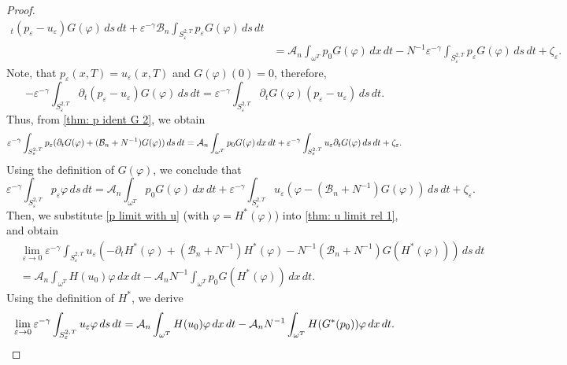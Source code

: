 \documentclass[reqno]{amsart}
\begin{document}
\begin{proof}
\begin{equation}
\begin{aligned}
_{t}(p_{\varepsilon }-u_{\varepsilon })G(\varphi )\,ds\,dt+\varepsilon
^{-\gamma }\mathcal{B}_n\int _{S_{\varepsilon }^{2,T}}p_{\varepsilon
}G(\varphi )\,ds\,dt    \\
&=\mathcal{A}_n\int _{\omega ^{T}}p_0G(\varphi )\,dx\,dt%
-N^{-1}\varepsilon ^{-\gamma }\int _{S_{\varepsilon
}^{2,T}}p_{\varepsilon }G(\varphi )\,ds\,dt+\zeta _{\varepsilon }.
\end{aligned} \label{thm: p ident G 2}
\end{equation}
Note, that $p_{\varepsilon }(x,T)=u_{\varepsilon }(x,T)$ and
$G(\varphi)(0)=0$, therefore,
\[
-\varepsilon ^{-\gamma }\int _{S_{\varepsilon }^{2,T}}\partial
_{t}(p_{\varepsilon }-u_{\varepsilon })G(\varphi )\,ds\,dt=\varepsilon
^{-\gamma }\int _{S_{\varepsilon }^{2,T}}\partial _{t}G(\varphi
)(p_{\varepsilon }-u_{\varepsilon })\,ds\,dt.
\]%
Thus, from \eqref{thm: p ident G 2}, we obtain
\[
\varepsilon ^{-\gamma }\int _{S_{\varepsilon }^{2,T}}p_{\varepsilon
}(\partial _{t}G(\varphi )+(\mathcal{B}_n+N^{-1})G(\varphi ))\,ds\,dt \\
=\mathcal{A}_n\int _{\omega ^{T}}p_0G(\varphi )\,dx\,dt+\varepsilon
^{-\gamma }\int _{S_{\varepsilon }^{2,T}}u_{\varepsilon }\partial
_{t}G(\varphi )\,ds\,dt+\zeta _{\varepsilon }.
\]
Using the definition of $G(\varphi )$, we conclude that
\begin{equation}
\varepsilon ^{-\gamma }\int _{S_{\varepsilon }^{2,T}}p_{\varepsilon
}\varphi \,ds\,dt=\mathcal{A}_n\int _{\omega ^{T}}p_0G(\varphi ){\,dx\,dt%
}+\varepsilon ^{-\gamma }\int _{S_{\varepsilon }^{2,T}}u_{\varepsilon
}(\varphi -(\mathcal{B}_n+N^{-1})G(\varphi ))\,ds\,dt+\zeta _{\varepsilon }.
\label{p limit with u}
\end{equation}
Then, we substitute \eqref{p limit with u} (with
$\varphi =H^{\ast }(\varphi)$) into \eqref{thm: u limit rel 1}, and obtain
\begin{align*}
&\lim _{\varepsilon \to 0}\varepsilon ^{-\gamma
}\int _{S_{\varepsilon }^{2,T}}u_{\varepsilon }(-\partial _{t}H^{\ast
}(\varphi )+(\mathcal{B}_n+N^{-1})H^{\ast }(\varphi )-N^{-1}(\mathcal{B}%
_n+N^{-1})G(H^{\ast }(\varphi )))\,ds\,dt \\
&=\mathcal{A}_n\int _{\omega ^{T}}H(u_0)\varphi \,dx\,dt-\mathcal{A}%
_nN^{-1}\int _{\omega ^{T}}p_0G(H^{\ast }(\varphi ))\,dx\,dt.
\end{align*}
Using the definition of $H^{\ast }$, we derive
\begin{equation}
\lim _{\varepsilon \to 0}\varepsilon ^{-\gamma
}\int _{S_{\varepsilon }^{2,T}}u_{\varepsilon }\varphi \,ds\,dt=\mathcal{%
A}_n\int _{\omega ^{T}}H(u_0)\varphi \,dx\,dt-\mathcal{A}%
_nN^{-1}\int _{\omega ^{T}}H(G^{\ast }(p_0))\varphi \,dx\,dt.
\label{thm: u limit rel}
\end{equation}


\end{proof}
\end{document}
